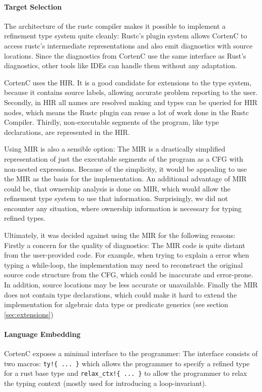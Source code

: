 \documentclass{book}
\newcommand{\code}[1]{\texttt{#1}}
\theoremstyle{definition}
\begin{document}
\paragraph{Target Selection}
The architecture of the rustc compiler makes it possible to implement a refinement type system quite cleanly: Rustc's plugin system allows CortenC to access rustc's intermediate representations and also emit diagnostics with source locations. Since the diagnostics from CortenC use the same interface as Rust's diagnostics, other tools like IDEs can handle them without any adaptation.

CortenC uses the HIR. It is a good candidate for extensions to the type system, because it contains source labels, allowing accurate problem reporting to the user. Secondly, in HIR all names are resolved making and types can be queried for HIR nodes, which means the Rustc plugin can reuse a lot of work done in the Rustc Compiler. Thirdly, non-executable segments of the program, like type declarations, are represented in the HIR.

Using MIR is also a sensible option: The MIR is a drastically simplified representation of just the executable segments of the program as a CFG with non-nested expressions. Because of the simplicity, it would be appealing to use the MIR as the basis for the implementation. 
An additional advantage of MIR could be, that ownership analysis is done on MIR, which would allow the refinement type system to use that information. Surprisingly, we did not encounter any situation, where ownership information is necessary for typing refined types.

Ultimately, it was decided against using the MIR for the following reasons:
Firstly a concern for the quality of diagnostics: The MIR code is quite distant from the user-provided code. For example, when trying to explain a error when typing a while-loop, the implementation may need to reconstruct the original source code structure from the CFG, which could be inaccurate and error-prone. 
In addition, source locations may be less accurate or unavailable. 
Finally the MIR does not contain type declarations, which could make it hard to extend the implementation for algebraic data type or predicate generics (see section \ref{sec:extensions})

\paragraph{Language Embedding}
CortenC exposes a minimal interface to the programmer: The interface consists of two macros:
\code{ty!\{ ... \}} which allows the programmer to specify a refined type for a rust base type and
\code{relax\_ctx!\{ ... \}} to allow the programmer to relax the typing context (mostly used for introducing a loop-invariant). 
\end{document}
